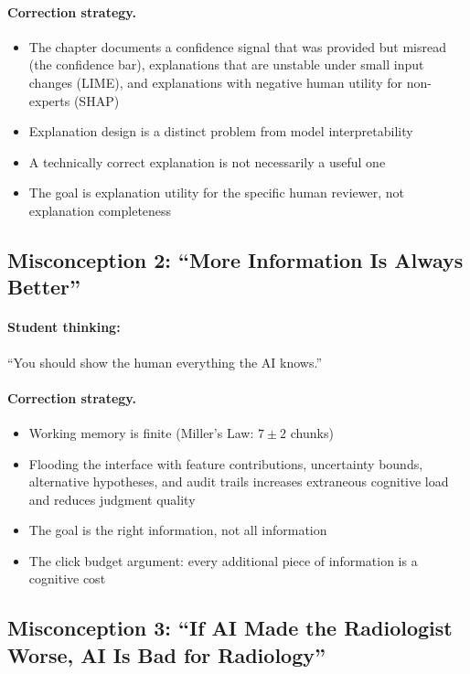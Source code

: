 \paragraph{Correction strategy.}
\begin{itemize}
    \item The chapter documents a confidence signal that was provided but misread (the confidence bar), explanations that are unstable under small input changes (LIME), and explanations with negative human utility for non-experts (SHAP)
    \item Explanation design is a distinct problem from model interpretability
    \item A technically correct explanation is not necessarily a useful one
    \item The goal is explanation utility for the specific human reviewer, not explanation completeness
\end{itemize}

\subsection{Misconception 2: ``More Information Is Always Better''}

\paragraph{Student thinking:} ``You should show the human everything the AI knows.''

\paragraph{Correction strategy.}
\begin{itemize}
    \item Working memory is finite (Miller's Law: $7 \pm 2$ chunks)
    \item Flooding the interface with feature contributions, uncertainty bounds, alternative hypotheses, and audit trails increases extraneous cognitive load and reduces judgment quality
    \item The goal is the right information, not all information
    \item The click budget argument: every additional piece of information is a cognitive cost
\end{itemize}

\subsection{Misconception 3: ``If AI Made the Radiologist Worse, AI Is Bad for Radiology''}

